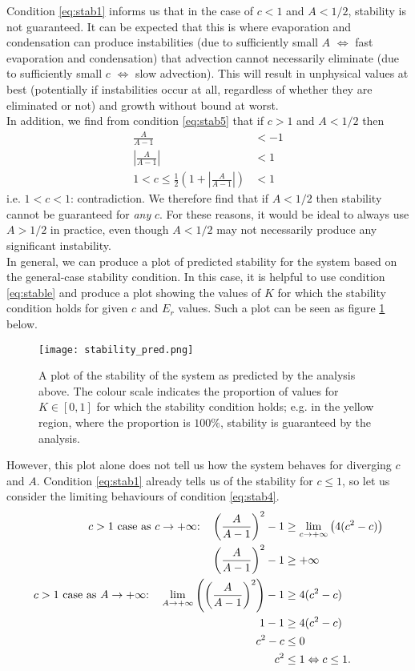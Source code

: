 \documentclass[11pt]{article}
\begin{document}
Condition \ref{eq:stab1} informs us that in the case of $c<1$ and $A<1/2$, stability is not guaranteed. It can be expected that this is where evaporation and condensation can produce instabilities (due to sufficiently small $A$ $\Leftrightarrow$ fast evaporation and condensation) that advection cannot necessarily eliminate (due to sufficiently small $c$ $\Leftrightarrow$ slow advection). This will result in unphysical values at best (potentially if instabilities occur at all, regardless of whether they are eliminated or not) and growth without bound at worst. \\
In addition, we find from condition \ref{eq:stab5} that if $c>1$ and $A<1/2$ then
\begin{align*}
\frac{A}{A-1} &< -1 \\
\left|\frac{A}{A-1}\right| &< 1 \\
1 < c \leq \frac{1}{2}\left(1 + \left|\frac{A}{A-1}\right|\right) &< 1
\end{align*}
i.e. $1<c<1$: contradiction. We therefore find that if $A<1/2$ then stability cannot be guaranteed for \emph{any} $c$. For these reasons, it would be ideal to always use $A>1/2$ in practice, even though $A<1/2$ may not necessarily produce any significant instability. \\
In general, we can produce a plot of predicted stability for the system based on the general-case stability condition. In this case, it is helpful to use condition \ref{eq:stable} and produce a plot showing the values of $K$ for which the stability condition holds for given $c$ and $E_r$ values. Such a plot can be seen as figure \ref{fig:stability_pred} below.
\begin{figure}[H]
\centering
\texttt{[image: stability\_pred.png]}
\caption{A plot of the stability of the system as predicted by the analysis above. The colour scale indicates the proportion of values for $K\in[0,1]$ for which the stability condition holds; e.g. in the yellow region, where the proportion is $100\%$, stability is guaranteed by the analysis.}
\label{fig:stability_pred}
\end{figure}
However, this plot alone does not tell us how the system behaves for diverging $c$ and $A$. Condition \ref{eq:stab1} already tells us of the stability for $c\leq 1$, so let us consider the limiting behaviours of condition \ref{eq:stab4}.
\begin{align}
\text{$c>1$ case as $c\to +\infty$:\quad} \left(\frac{A}{A-1}\right)^2 -1 &\geq \lim_{c\to +\infty}\left(4(c^2-c)\right) \nonumber \\
\left(\frac{A}{A-1}\right)^2 -1 &\geq +\infty		\label{eq:stab2} \\
\text{$c>1$ case as $A\to +\infty$:\quad} \lim_{A\to +\infty}\left(\left(\frac{A}{A-1}\right)^2\right)-1 &\geq 4(c^2-c) \nonumber\\
1 - 1 &\geq 4(c^2-c) \nonumber\\
c^2-c &\leq 0 \nonumber\\
c^2 &\leq 1 \Leftrightarrow
c \leq 1.		\label{eq:stab3}
\end{align}
\end{document}
